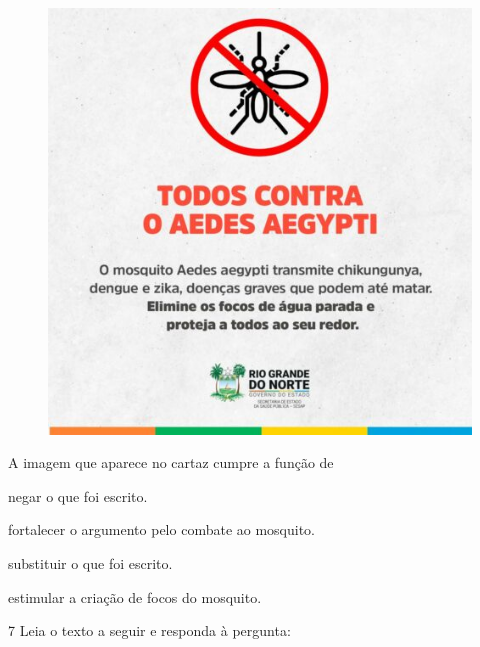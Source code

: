 \begin{figure}[htpb!]
\includegraphics[width=\textwidth]{./imgs/img25.jpg}
\end{figure}

A imagem que aparece no cartaz cumpre a função de

\begin{escolha}
\item negar o que foi escrito.

\item fortalecer o argumento pelo combate ao mosquito.

\item substituir o que foi escrito.

\item estimular a criação de focos do mosquito.
\end{escolha}


\num{7} Leia o texto a seguir e responda à pergunta:

